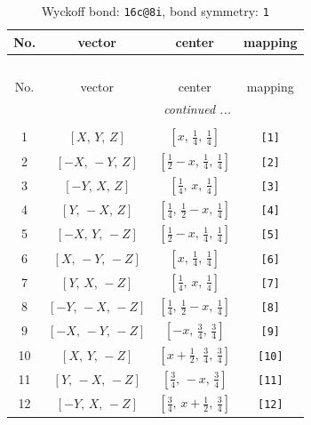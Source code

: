 \documentclass[fleqn,8pt]{jsarticle}
\begin{document}
\begin{longtable}{cccc}
\caption{Wyckoff bond: {\tt 16c@8i}, bond symmetry: {\tt 1}}
 \\
 \hline \hline
No. & vector & center & mapping \\ \hline \endfirsthead

\multicolumn{3}{l}{\tablename\ \thetable{}} \\
 \hline \hline
No. & vector & center & mapping \\ \hline \endhead

 \hline \hline
\multicolumn{3}{r}{\footnotesize\it continued ...} \\ \endfoot

 \hline \hline
\multicolumn{3}{r}{} \\ \endlastfoot

1 & $\left[ X,\, Y,\, Z \right]$ & $\left[ x,\, \frac{1}{4},\, \frac{1}{4} \right]$ & {\tt [1]} \\ \hline
2 & $\left[ - X,\, - Y,\, Z \right]$ & $\left[ \frac{1}{2} - x,\, \frac{1}{4},\, \frac{1}{4} \right]$ & {\tt [2]} \\ \hline
3 & $\left[ - Y,\, X,\, Z \right]$ & $\left[ \frac{1}{4},\, x,\, \frac{1}{4} \right]$ & {\tt [3]} \\ \hline
4 & $\left[ Y,\, - X,\, Z \right]$ & $\left[ \frac{1}{4},\, \frac{1}{2} - x,\, \frac{1}{4} \right]$ & {\tt [4]} \\ \hline
5 & $\left[ - X,\, Y,\, - Z \right]$ & $\left[ \frac{1}{2} - x,\, \frac{1}{4},\, \frac{1}{4} \right]$ & {\tt [5]} \\ \hline
6 & $\left[ X,\, - Y,\, - Z \right]$ & $\left[ x,\, \frac{1}{4},\, \frac{1}{4} \right]$ & {\tt [6]} \\ \hline
7 & $\left[ Y,\, X,\, - Z \right]$ & $\left[ \frac{1}{4},\, x,\, \frac{1}{4} \right]$ & {\tt [7]} \\ \hline
8 & $\left[ - Y,\, - X,\, - Z \right]$ & $\left[ \frac{1}{4},\, \frac{1}{2} - x,\, \frac{1}{4} \right]$ & {\tt [8]} \\ \hline
9 & $\left[ - X,\, - Y,\, - Z \right]$ & $\left[ - x,\, \frac{3}{4},\, \frac{3}{4} \right]$ & {\tt [9]} \\ \hline
10 & $\left[ X,\, Y,\, - Z \right]$ & $\left[ x + \frac{1}{2},\, \frac{3}{4},\, \frac{3}{4} \right]$ & {\tt [10]} \\ \hline
11 & $\left[ Y,\, - X,\, - Z \right]$ & $\left[ \frac{3}{4},\, - x,\, \frac{3}{4} \right]$ & {\tt [11]} \\ \hline
12 & $\left[ - Y,\, X,\, - Z \right]$ & $\left[ \frac{3}{4},\, x + \frac{1}{2},\, \frac{3}{4} \right]$ & {\tt [12]} \\ \hline

\end{longtable}
\end{document}
